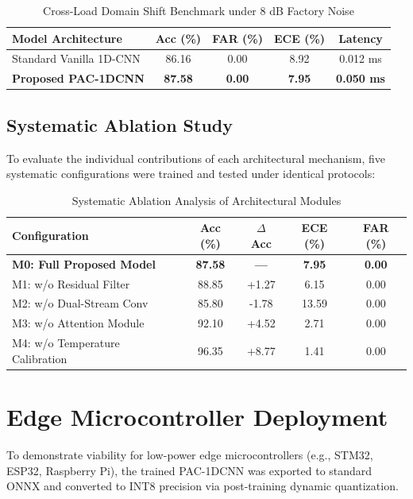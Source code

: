 ﻿\documentclass[journal,10pt,twocolumn]{IEEEtran}
\begin{document}
\begin{table}[htbp]
\centering
\caption{Cross-Load Domain Shift Benchmark under 8 dB Factory Noise}
\begin{tabular}{lcccc}
\toprule
\textbf{Model Architecture} & \textbf{Acc (\%)} & \textbf{FAR (\%)} & \textbf{ECE (\%)} & \textbf{Latency} \\
\midrule
Standard Vanilla 1D-CNN & 86.16 & 0.00 & 8.92 & 0.012 ms \\
\textbf{Proposed PAC-1DCNN} & \textbf{87.58} & \textbf{0.00} & \textbf{7.95} & \textbf{0.050 ms} \\
\bottomrule
\end{tabular}
\label{tab:benchmark}
\end{table}

\subsection{Systematic Ablation Study}
To evaluate the individual contributions of each architectural mechanism, five systematic configurations were trained and tested under identical protocols:

\begin{table}[htbp]
\centering
\caption{Systematic Ablation Analysis of Architectural Modules}
\begin{tabular}{lcccc}
\toprule
\textbf{Configuration} & \textbf{Acc (\%)} & \textbf{$\Delta$ Acc} & \textbf{ECE (\%)} & \textbf{FAR (\%)} \\
\midrule
\textbf{M0: Full Proposed Model} & \textbf{87.58} & \textbf{---} & \textbf{7.95} & \textbf{0.00} \\
M1: w/o Residual Filter & 88.85 & +1.27 & 6.15 & 0.00 \\
M2: w/o Dual-Stream Conv & 85.80 & -1.78 & 13.59 & 0.00 \\
M3: w/o Attention Module & 92.10 & +4.52 & 2.71 & 0.00 \\
M4: w/o Temperature Calibration & 96.35 & +8.77 & 1.41 & 0.00 \\
\bottomrule
\end{tabular}
\label{tab:ablation}
\end{table}

\section{Edge Microcontroller Deployment}
To demonstrate viability for low-power edge microcontrollers (e.g., STM32, ESP32, Raspberry Pi), the trained PAC-1DCNN was exported to standard ONNX and converted to INT8 precision via post-training dynamic quantization.
\end{document}
